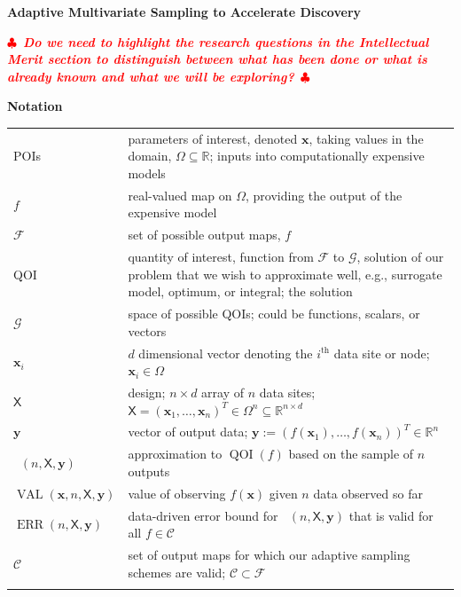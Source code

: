 \documentclass[11pt]{NSFamsart}
\DeclareMathOperator{\QOI}{QOI}
\DeclareMathOperator{\APP}{\widehat{\QOI}}
\DeclareMathOperator{\ERR}{ERR}
\DeclareMathOperator{\VAL}{VAL}
\newcommand{\reals}{{\mathbb{R}}}
\newcommand{\mX}{\mathsf{X}}
\newcommand{\bx}{{\boldsymbol{x}}}
\newcommand{\by}{{\boldsymbol{y}}}
\newcommand{\calc}{{\mathcal{C}}}
\newcommand{\calf}{{\mathcal{F}}}
\newcommand{\calg}{{\mathcal{G}}}
\newif\ifnotesw \noteswtrue
\newcommand{\notes}[1]{\ifnotesw \textcolor{red}{  $\clubsuit$\ {\sf \bf \it  #1}\ $\clubsuit$  }\fi}
\begin{document}

\begin{center}
\Large \textbf{
Adaptive Multivariate Sampling to Accelerate  Discovery\\ 
}
\end{center}
\vspace{-2ex}

\setcounter{tocdepth}{3}
\tableofcontents

\vspace{-6ex}


\notes{Do we need to highlight the research questions in the Intellectual Merit section to distinguish between what has been done or what is already known and what we will be exploring?}

\noindent \textbf{Notation}

\begin{longtable}{>{\raggedleft}p{2.5cm}@{\quad}>{\raggedright}p{12.5cm}}
POIs & parameters of interest, denoted $\bx$, taking values in the domain, $\Omega \subseteq \reals$; inputs into computationally expensive models \tabularnewline
$f$ & real-valued map on $\Omega$, providing the output of the expensive model \tabularnewline
$\calf$ & set of possible output maps, $f$ \tabularnewline
QOI & quantity of interest, function from $\calf$ to $\calg$, solution of our problem that we wish to approximate well, e.g., surrogate model, optimum, or integral; the solution \tabularnewline
$\calg$ & space of possible QOIs; could be functions, scalars, or vectors\tabularnewline
$\bx_i$ & $d$ dimensional vector denoting the $i^{\text{th}}$ data site or node; $\bx_i \in \Omega$ \tabularnewline
$\mX$ & design;  $n \times d$ array of $n$ data sites; $\mX = (\bx_1, \ldots, \bx_n)^T \in \Omega^{n} \subseteq \reals^{n \times d}$ \tabularnewline
$\by$ & vector of output data; $\by := (f(\bx_1), \ldots, f(\bx_n))^T \in \reals^n$   \tabularnewline
$\APP(n,\mX,\by)$ & approximation to $\QOI(f)$ based on the sample of $n$ outputs\tabularnewline
$\VAL(\bx,n,\mX, \by)$ & value of observing $f(\bx)$ given $n$ data observed so far \tabularnewline
$\ERR(n,\mX,\by)$ & data-driven error bound for $\APP(n,\mX,\by)$ that is valid for all $f \in \calc$ \tabularnewline
$\calc$ & set of output maps for which our adaptive sampling schemes are valid; $\calc \subset \calf$ \tabularnewline
& \tabularnewline
\end{longtable}

\end{document}
